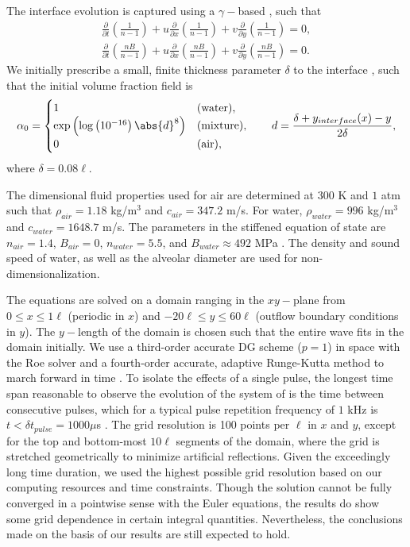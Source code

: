The interface evolution is captured using a $\gamma-$based
\citep{Shyue1998}, such that
\begin{subequations} \label{usbe_lung_eosvar_advection}%
  \begin{align}%
    \frac{\partial}{\partial t}\left(\frac{1}{n-1}\right)+u\frac{\partial}{\partial x}\left(\frac{1}{n-1}\right)+v\frac{\partial}{\partial y}\left(\frac{1}{n-1}\right) = 0,\\
    \frac{\partial}{\partial t}\left(\frac{n B}{n-1}\right)+u\frac{\partial}{\partial x}\left(\frac{n B}{n-1}\right)+v\frac{\partial}{\partial y}\left(\frac{n B}{n-1}\right) = 0.
  \end{align}%
\end{subequations}%
We initially prescribe a small, finite thickness parameter $\delta$ to
the interface \citep{Latini2007}, such that the initial volume
fraction field is
\begin{align}
  \alpha_0 = %
  \begin{cases}
    1&$\text(water)$,\\%
    \exp\left(\log\left(10^{-16}\right)\abs{d}^8\right)&$\text(mixture)$,\\%
    0&$\text(air)$,%
  \end{cases} \qquad d = \frac{\delta +y_{interface}(x) -y}{2\delta},
\end{align}
where $\delta=0.08\ell$.

The dimensional fluid properties used for air are determined at $300$
K and $1$ atm such that $\rho_{air}=1.18$ kg/m$^3$ and $c_{air}=347.2$
m/s. For water, $\rho_{water}=996$ kg/m$^3$ and $c_{water}=1648.7$
m/s.  The parameters in the stiffened equation of state are
$n_{air}=1.4$, $B_{air} = 0$, $n_{water}=5.5$, and $B_{water} \approx
492$ MPa \citep{Marsh1980,holian1984t,Cocchi1996}. The density and
sound speed of water, as well as the alveolar diameter are used for
non-dimensionalization.

The equations are solved on a domain ranging in the $xy-$plane from
$0 \leq x \leq 1\ell$ (periodic in $x$) and
$-20\ell \leq y \leq 60\ell$ (outflow boundary conditions in $y$). The
$y-$length of the domain is chosen such that the entire wave fits in
the domain initially.  We use a third-order accurate \ac{DG} scheme
($p=1$) in space with the Roe solver and a fourth-order accurate,
adaptive Runge-Kutta method to march forward in time
\citep{HenrydeFrahan2015}. To isolate the effects of a single pulse,
the longest time span reasonable to observe the evolution of the
system of is the time between consecutive pulses, which for a typical
pulse repetition frequency of $1$ kHz is
$t<\delta t_{pulse}=1000 \mu$s \citep{OBrien2000b}. The grid
resolution is 100 points per $\ell$ in $x$ and $y$, except for the top
and bottom-most $10\ell$ segments of the domain, where the grid is
stretched geometrically to minimize artificial reflections. Given the
exceedingly long time duration, we used the highest possible grid
resolution based on our computing resources and time constraints.
Though the solution cannot be fully converged in a pointwise sense
with the Euler equations, the results do show some grid dependence in
certain integral quantities. Nevertheless, the conclusions made on the
basis of our results are still expected to hold.

